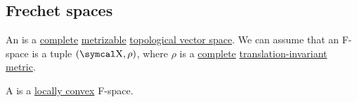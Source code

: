 \subsection{Frechet spaces}\label{subsec:frechet_spaces}

\begin{definition}\label{def:frechet_space}
  An  is a \hyperref[def:uniform_completion]{complete} \hyperref[def:metric_topology]{metrizable} \hyperref[def:topological_vector_space]{topological vector space}. We can assume that an F-space is a tuple \( (\CX, \rho) \), where \( \rho \) is a \hyperref[def:complete_metric_space]{complete} \hyperref[def:translation_invariant_metric]{translation-invariant} \hyperref[def:metric_space]{metric}.

  A  is a \hyperref[def:locally_convex_space]{locally convex} F-space.
\end{definition}

